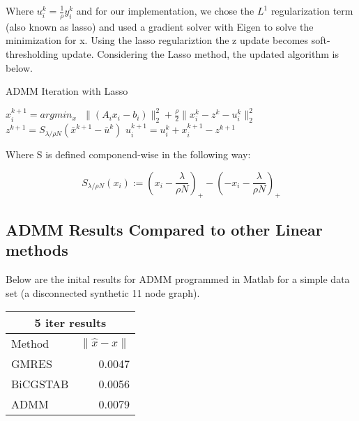\documentclass[a4paper,10pt]{article}
\begin{document}
Where $u_{i}^{k} = \frac{1}{\rho} y_{i}^{k}$ and for our implementation, we chose the $L^{1}$ regularization term (also known as lasso) and used a gradient solver with Eigen to solve the minimization for x. Using the lasso regulariztion the z update becomes soft-thresholding update. Considering the Lasso method, the updated algorithm is below.

\begin{center}
\begin{algorithm}
\caption{ADMM Iteration with Lasso}
\begin{algorithmic}[1]
  \STATE $x_{i}^{k+1} = argmin_{x} \: \: \: \|(A_{i}x_{i} - b_{i})\|_{2}^{2} + \frac{\rho}{2} \| x_{i}^{k} - z^{k} - u_{i}^{k} \|_{2}^{2}$ 
  \STATE $z^{k+1} = S_{\lambda/\rho N} (\bar{x}^{k+1} - \bar{u}^{k})$
	\STATE $u_{i}^{k+1} = u_{i}^{k} + x_{i}^{k+1} - z^{k+1} $ 
  \end{algorithmic}
\end{algorithm}
\end{center}

Where S is defined componend-wise in the following way:
\begin{center}
	\begin{equation}
	  S_{\lambda/\rho N}(x_{i}) := (x_{i} - \frac{\lambda}{\rho N})_{+} - (-x_{i} - \frac{\lambda}{\rho N})_{+}
	\end{equation}
\end{center}

\subsection{ADMM Results Compared to other Linear methods}
Below are the inital results for ADMM programmed in Matlab for a simple data set (a disconnected synthetic 11 node graph). 

\begin{center}
\begin{tabular}{l || r}
	\hline\hline
	\multicolumn{2}{c}{5 iter results} \\
	\hline\hline
	Method  & $\|\hat{x} - x\| $ \\
	\hline
	GMRES & 0.0047  \\
	BiCGSTAB & 0.0056  \\
	ADMM & 0.0079  \\
\end{tabular}
\end{center}
\newpage
\end{document}
